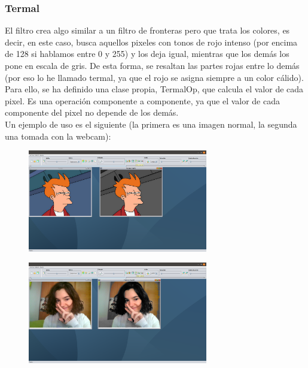\documentclass[11pt,a4paper]{article}
\begin{document}
\subsubsection{Termal}
El filtro crea algo similar a un filtro de fronteras pero que trata los colores, es decir, en este caso, busca aquellos pixeles con tonos de rojo intenso (por encima de 128 si hablamos entre 0 y 255) y los deja igual, mientras que los demás los pone en escala de gris. De esta forma, se resaltan las partes rojas entre lo demás (por eso lo he llamado termal, ya que el rojo se asigna siempre a un color cálido).\\

Para ello, se ha definido una clase propia, TermalOp, que calcula el valor de cada pixel. Es una operación componente a componente, ya que el valor de cada componente del pixel no depende de los demás.\\

Un ejemplo de uso es el siguiente (la primera es una imagen normal, la segunda una tomada con la webcam):

\begin{figure}[H]
\centering
	\includegraphics[width=0.7\textwidth]{img/termal.png}
\end{figure}

\begin{figure}[H]
\centering
	\includegraphics[width=0.7\textwidth]{img/thermal.png}
\end{figure}
\end{document}
